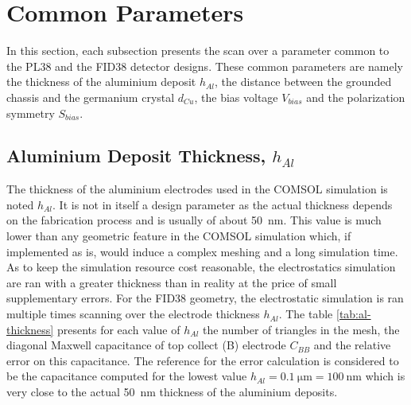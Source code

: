\section{Common Parameters}

In this section, each subsection presents the scan over a parameter common to the PL38 and the FID38 detector designs. These common parameters are namely the thickness of the aluminium deposit $h_{Al}$, the distance between the grounded chassis and the germanium crystal $d_{Cu}$, the bias voltage $V_{bias}$ and the polarization symmetry $S_{bias}$.


\subsection{Aluminium Deposit Thickness, $h_{Al}$}

The thickness of the aluminium electrodes used in the COMSOL simulation is noted $h_{Al}$. It is not in itself a design parameter as the actual thickness depends on the fabrication process and is usually of about \SI{50}{\nano\meter}. This value is much lower than any geometric feature in the COMSOL simulation which, if implemented as is, would induce a complex meshing and a long simulation time. As to keep the simulation resource cost reasonable, the electrostatics simulation are ran with a greater thickness than in reality at the price of small supplementary errors. For the FID38 geometry, the electrostatic simulation is ran multiple times scanning over the electrode thickness $h_{Al}$. The table \ref{tab:al-thickness} presents for each value of $h_{Al}$ the number of triangles in the mesh, the diagonal Maxwell capacitance of top collect (B) electrode $C_{BB}$ and the relative error on this capacitance. The reference for the error calculation is considered to be the capacitance computed for the lowest value $h_{Al}=\SI{0.1}{\micro\meter} = \SI{100}{\nano\meter}$ which is very close to the actual \SI{50}{\nano\meter} thickness of the aluminium deposits.

